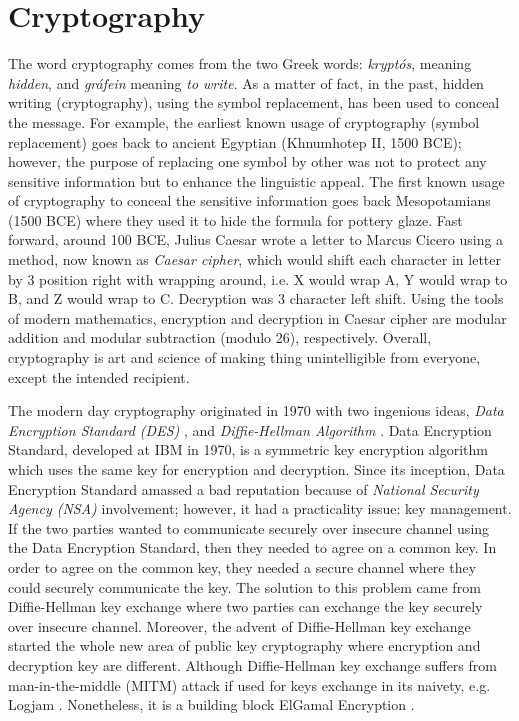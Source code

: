 \section{Cryptography}
\label{sec:cryptography}
    The word cryptography comes from the two Greek words: 
    \textit{krypt\'{o}s}, meaning \textit{hidden}, and \textit{gr\'{a}fein} meaning \textit{to write}. As a matter of 
    fact, in the past, hidden writing (cryptography), using the symbol replacement, has been used 
    to conceal the message. For example,
    the earliest known usage of cryptography (symbol replacement) goes back to  ancient 
    Egyptian (Khnumhotep {\rm II}, 1500 BCE); however, the purpose of replacing one symbol by other 
    was not to protect
    any sensitive information but to enhance the linguistic appeal. The first known usage of 
    cryptography to conceal the sensitive information goes back Mesopotamians (1500 BCE) where 
    they used it to hide the formula for pottery glaze. Fast forward, around 100 BCE, 
    Julius Caesar wrote a letter to Marcus  Cicero using a method, now known 
    as \textit{Caesar cipher}, which would shift each character in letter by 3 position right with wrapping 
    around, i.e. X would wrap A, Y would wrap to B, and Z would wrap to C. Decryption was 
	3 character left shift.  Using the  tools of modern mathematics, encryption and decryption 
	in Caesar cipher are modular addition and modular subtraction (modulo 26), respectively.  
    Overall, cryptography is art and science of making thing  unintelligible from everyone, except the 
    intended recipient.  	
	    
	The modern day cryptography originated in 1970 with two ingenious ideas, \textit{Data Encryption Standard (DES)} \citep{standard1999data} , 
	and \textit{Diffie-Hellman Algorithm} \citep{Diffie:2006:NDC:2263321.2269104}.  Data Encryption Standard, developed at IBM in 1970, is a symmetric 
	key encryption algorithm which uses the same key for encryption and decryption. Since its inception, Data Encryption Standard
	amassed a bad reputation because of \textit{National Security Agency (NSA)} involvement; however, it had a 
	practicality issue: key management. If the two parties wanted to communicate
	securely over insecure channel using  the Data Encryption Standard, then they needed to agree on a common key. 
	In order to agree on the common key, they needed a secure channel where they could securely communicate the key. 
    The solution to this problem came from Diffie-Hellman key exchange where two parties can exchange the 
    key securely over insecure channel. Moreover, the advent of Diffie-Hellman key exchange started the 
    whole new area of public key cryptography where encryption and decryption key are different. 
    Although Diffie-Hellman key exchange suffers from  man-in-the-middle (MITM)  attack if used for keys exchange in its 
    naivety, e.g. Logjam \citep{Adrian:2015:IFS:2810103.2813707}. Nonetheless, 
    it is a building block ElGamal Encryption \citep{elgamal1985public}. 
    
